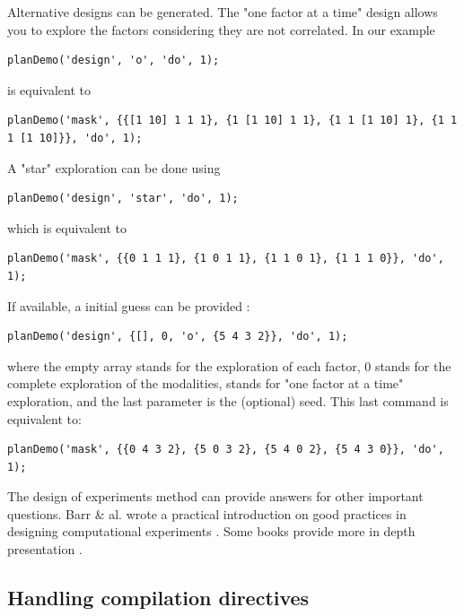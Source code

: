 \documentclass[a4paper,fleqn]{tufte-handout}
\begin{document}
Alternative designs can be generated. The "one factor at a time" design allows you to explore the factors considering they are not correlated. In our example

\begin{lstlisting}
planDemo('design', 'o', 'do', 1);
\end{lstlisting}

is equivalent to

\begin{lstlisting}
planDemo('mask', {{[1 10] 1 1 1}, {1 [1 10] 1 1}, {1 1 [1 10] 1}, {1 1 1 [1 10]}}, 'do', 1);
\end{lstlisting}

A "star" exploration can be done using

\begin{lstlisting}
planDemo('design', 'star', 'do', 1);
\end{lstlisting}

which is equivalent to

\begin{lstlisting}
planDemo('mask', {{0 1 1 1}, {1 0 1 1}, {1 1 0 1}, {1 1 1 0}}, 'do', 1);
\end{lstlisting}

If available, a initial guess can be provided :

\begin{lstlisting}
planDemo('design', {[], 0, 'o', {5 4 3 2}}, 'do', 1);
\end{lstlisting}
where the empty array stands for the exploration of each factor, 0 stands for the complete exploration of the modalities,  stands for "one factor at a time" exploration, and the last parameter is the (optional) seed. This last command is equivalent to:

\begin{lstlisting}
planDemo('mask', {{0 4 3 2}, {5 0 3 2}, {5 4 0 2}, {5 4 3 0}}, 'do', 1);
\end{lstlisting}

The design of experiments method can provide answers for other important questions. Barr \& al.  wrote a practical introduction on good practices in designing computational experiments \cite{design}. Some books provide more in depth presentation \cite{de,se}.




\subsection{Handling compilation directives}
\end{document}
